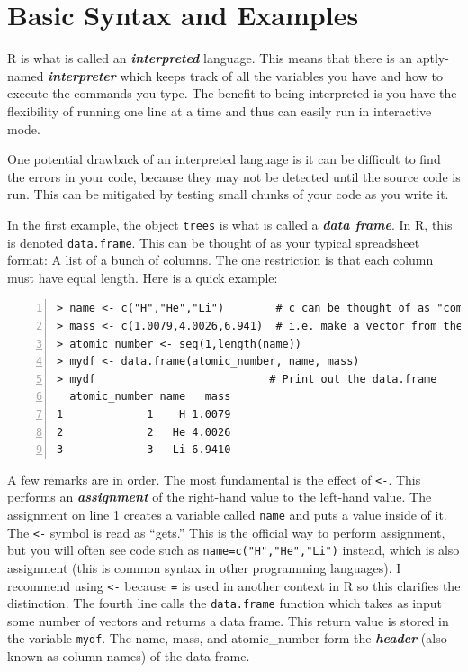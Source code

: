 \documentclass[12pt]{article}
\theoremstyle{remark}
\newcommand{\vocab}[1]{\textbf{\emph{#1}}}
\begin{document}
\section{Basic Syntax and Examples}

R is what is called an \vocab{interpreted} language. This means that there is an aptly-named \vocab{interpreter} which keeps track of all the variables you have and how to execute the commands you type. The benefit to being interpreted is you have the flexibility of running one line at a time and thus can easily run in interactive mode.

One potential drawback of an interpreted language is it can be difficult to find the errors in your code, because they may not be detected until the source code is run. This can be mitigated by testing small chunks of your code as you write it.

In the first example, the object \verb|trees| is what is called a \vocab{data frame}. In R, this is denoted \verb|data.frame|. This can be thought of as your typical spreadsheet format: A list of a bunch of columns. The one restriction is that each column must have equal length. Here is a quick example:

\begin{Verbatim}[frame=single, fontsize=\small,  numbers=left]
> name <- c("H","He","Li")        # c can be thought of as "combine"
> mass <- c(1.0079,4.0026,6.941)  # i.e. make a vector from the arguments
> atomic_number <- seq(1,length(name))
> mydf <- data.frame(atomic_number, name, mass)
> mydf                           # Print out the data.frame
  atomic_number name   mass
1             1    H 1.0079
2             2   He 4.0026
3             3   Li 6.9410
\end{Verbatim}

A few remarks are in order. The most fundamental is the effect of \verb|<-|. This performs an \vocab{assignment} of the right-hand value to the left-hand value. The assignment on line 1 creates a variable called \verb|name| and puts a value inside of it. The \verb|<-| symbol is read as ``gets.'' This is the official way to perform assignment, but you will often see code such as \verb|name=c("H","He","Li")| instead, which is also assignment (this is common syntax in other programming languages). I recommend using \verb|<-| because \verb|=| is used in another context in R so this clarifies the distinction. The fourth line calls the \verb|data.frame| function which takes as input some number of vectors and returns a data frame. This return value is stored in the variable \verb|mydf|.  The name, mass, and atomic\_number form the \vocab{header} (also known as column names) of the data frame.
\end{document}
